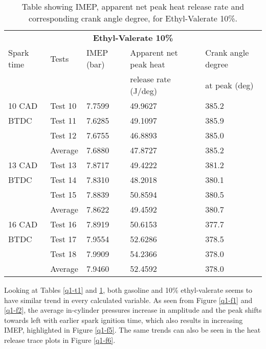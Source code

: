 \begin{table}[H]
    \begin{center}
        \begin{tabular}{@{}l l l l l@{}}
            \toprule
            \multicolumn{5}{c}{\textbf{Ethyl-Valerate 10\%}}                                        \\
            Spark time & Tests   & IMEP (bar) & Apparent net peak heat         & Crank angle degree \\
                       &         &            & release rate (\si{\joule}/deg) & at peak (deg)      \\
            \midrule
            10 CAD     & Test 10 & 7.7599     & 49.9627                        & 385.2              \\
            BTDC       & Test 11 & 7.6285     & 49.1097                        & 385.9              \\
                       & Test 12 & 7.6755     & 46.8893                        & 385.0              \\
                       & Average & 7.6880     & 47.8727                        & 385.2              \\
            13 CAD     & Test 13 & 7.8717     & 49.4222                        & 381.2              \\
            BTDC       & Test 14 & 7.8310     & 48.2018                        & 380.1              \\
                       & Test 15 & 7.8839     & 50.8594                        & 380.5              \\
                       & Average & 7.8622     & 49.4592                        & 380.7              \\
            16 CAD     & Test 16 & 7.8919     & 50.6153                        & 377.7              \\
            BTDC       & Test 17 & 7.9554     & 52.6286                        & 378.5              \\
                       & Test 18 & 7.9909     & 54.2366                        & 378.0              \\
                       & Average & 7.9460     & 52.4592                        & 378.0              \\
            \bottomrule
        \end{tabular}
        \caption{Table showing IMEP, apparent net peak heat release rate and corresponding crank angle degree, for Ethyl-Valerate 10\%.}
        \label{q1-t2}
    \end{center}
\end{table}
Looking at Tables \ref{q1-t1} and \ref{q1-t2}, both gasoline and 10\% ethyl-valerate seems to have similar trend in every calculated variable.  As seen from Figure \ref{q1-f1} and \ref{q1-f2}, the average in-cylinder pressures increase in amplitude and the peak shifts towards left with earlier spark ignition time, which also results in increasing IMEP, highlighted in Figure \ref{q1-f5}. The same trends can also be seen in the heat release trace plots in Figure \ref{q1-f6}.

